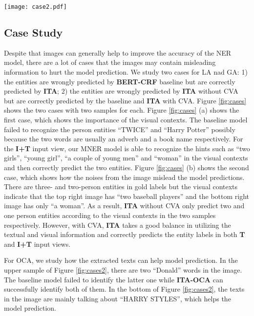 \documentclass[11pt]{article}
\begin{document}
\begin{figure*}
	\centering
	\texttt{[image: case2.pdf]}
	\caption{Examples of the positive effects of OCA. The named entities in the text are colored.}
	\label{fig:cases2}
\end{figure*}


\subsection{Case Study}
\label{app:case}
Despite that images can generally help to improve the accuracy of the NER model, there are a lot of cases that the images may contain misleading information to hurt the model prediction. We study two cases for LA nad GA: 1) the entities are wrongly predicted by \textbf{BERT-CRF} baseline but are correctly predicted by \textbf{ITA}; 2) the entities are wrongly predicted by \textbf{ITA} without CVA but are correctly predicted by the baseline and \textbf{ITA} with CVA. Figure \ref{fig:cases} shows the two cases with two samples for each. Figure \ref{fig:cases} (a) shows the first case, which shows the importance of the visual contexts. The baseline model failed to recognize the person entities ``TWICE'' and ``Harry Potter'' possibly because the two words are usually an adverb and a book name respectively. For the \textbf{I+T} input view, our MNER model is able to recognize the hints such as ``two girls'', ``young girl'', ``a couple of young men'' and ``woman'' in the visual contexts and then correctly predict the two entities. Figure \ref{fig:cases} (b) shows the second case, which shows how the noises from the image mislead the model predictions. There are three- and two-person entities in gold labels but the visual contexts indicate that the top right image has ``two baseball players'' and the bottom right image has only ``a woman''. As a result, \textbf{ITA} without CVA only predict two and one person entities according to the visual contexts in the two samples respectively. However, with CVA, \textbf{ITA} takes a good balance in utilizing the textual and visual information and correctly predicts the entity labels in both \textbf{T} and \textbf{I+T} input views.

For OCA, we study how the extracted texts can help model prediction. In the upper sample of Figure \ref{fig:cases2}, there are two ``Donald'' words in the image. The baseline model failed to identify the latter one while \textbf{ITA-OCA} can successfully identify both of them. In the bottom of Figure \ref{fig:cases2}, the texts in the image are mainly talking about ``HARRY STYLES'', which helps the model prediction.
\end{document}
